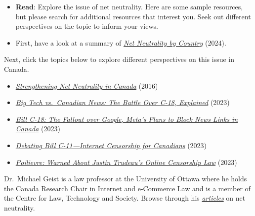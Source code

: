 \documentclass[
  letterpaper,
  DIV=11,
  numbers=noendperiod]{scrreprt}
\providecommand{\tightlist}{%
  \setlength{\itemsep}{0pt}\setlength{\parskip}{0pt}}\usepackage{longtable,booktabs,array}
\begin{document}
\begin{tcolorbox}[enhanced jigsaw, toprule=.15mm, colback=white, colframe=quarto-callout-note-color-frame, bottomtitle=1mm, leftrule=.75mm, coltitle=black, titlerule=0mm, rightrule=.15mm, colbacktitle=quarto-callout-note-color!10!white, left=2mm, title={Learning Activity}, opacitybacktitle=0.6, opacityback=0, breakable, toptitle=1mm, arc=.35mm, bottomrule=.15mm]

\begin{itemize}
\tightlist
\item
  \textbf{Read}: Explore the issue of net neutrality. Here are some
  sample resources, but please search for additional resources that
  interest you. Seek out different perspectives on the topic to inform
  your views.
\item
  First, have a look at a summary of
  \href{https://en.wikipedia.org/wiki/Net_neutrality_by_country\#:~:text=source\%20or\%20ownership.-,China,is\%20available\%20to\%20their\%20citizens}{\emph{Net
  Neutrality by Country}} (2024).
\end{itemize}

Next, click the topics below to explore different perspectives on this
issue in Canada.

\begin{itemize}
\tightlist
\item
  \href{https://crtc.gc.ca/eng/internet/diff.htm}{\emph{Strengthening
  Net Neutrality in Canada}} (2016)
\item
  \href{https://www.youtube.com/watch?v=k5iRopjAwm4}{\emph{Big Tech
  vs.~Canadian News: The Battle Over C-18, Explained}} (2023)
\item
  \href{https://www.youtube.com/watch?v=W5YLvCEd1yE}{\emph{Bill C-18:
  The Fallout over Google, Meta's Plans to Block News Links in Canada}}
  (2023)
\item
  \href{https://www.youtube.com/watch?v=bmd4sASKFRw}{\emph{Debating Bill
  C-11---Internet Censorship for Canadians}} (2023)
\item
  \href{https://www.youtube.com/watch?v=doPyNc6Sf_c}{\emph{Poilievre:
  Warned About Justin Trudeau's Online Censorship Law}} (2023)
\end{itemize}

Dr.~Michael Geist is a law professor at the University of Ottawa where
he holds the Canada Research Chair in Internet and e-Commerce Law and is
a member of the Centre for Law, Technology and Society. Browse through
his
\emph{\href{https://www.michaelgeist.ca/tech-law-topics/net-neutrality/}{articles}}
on net neutrality.


\end{tcolorbox}
\end{document}
